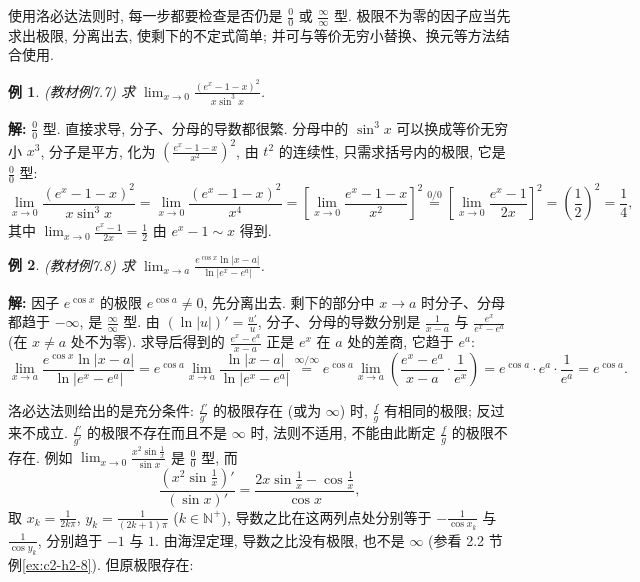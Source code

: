 \documentclass[UTF8,openany]{ctexbook}
\theoremstyle{chinesetextbook}
\newtheorem{example}{例}[section]
\newenvironment{cnsolution}{\par\indent\textbf{解:} \ignorespaces}{\par}
\begin{document}
使用洛必达法则时, 每一步都要检查是否仍是 $\displaystyle\frac00$ 或 $\displaystyle\frac\infty\infty$ 型. 极限不为零的因子应当先求出极限, 分离出去, 使剩下的不定式简单; 并可与等价无穷小替换、换元等方法结合使用.
\begin{example}\label{ex:c2-7-7}
\textnormal{(教材例7.7)} 求 $\displaystyle\lim_{x\to0}\frac{(e^x-1-x)^2}{x\sin^3x}$.
\end{example}
\begin{cnsolution}
$\displaystyle\frac00$ 型. 直接求导, 分子、分母的导数都很繁. 分母中的 $\sin^3x$ 可以换成等价无穷小 $x^3$, 分子是平方, 化为 $\displaystyle\left(\frac{e^x-1-x}{x^2}\right)^2$, 由 $t^2$ 的连续性, 只需求括号内的极限, 它是 $\displaystyle\frac00$ 型:
\[
\lim_{x\to0}\frac{(e^x-1-x)^2}{x\sin^3x}=\lim_{x\to0}\frac{(e^x-1-x)^2}{x^4}=\left[\lim_{x\to0}\frac{e^x-1-x}{x^2}\right]^2\overset{0/0}{=}\left[\lim_{x\to0}\frac{e^x-1}{2x}\right]^2=\left(\frac12\right)^2=\frac14,
\]
其中 $\displaystyle\lim_{x\to0}\frac{e^x-1}{2x}=\frac12$ 由 $e^x-1\sim x$ 得到.
\end{cnsolution}
\begin{example}\label{ex:c2-7-8}
\textnormal{(教材例7.8)} 求 $\displaystyle\lim_{x\to a}\frac{e^{\cos x}\ln|x-a|}{\ln|e^x-e^a|}$.
\end{example}
\begin{cnsolution}
因子 $e^{\cos x}$ 的极限 $e^{\cos a}\ne0$, 先分离出去. 剩下的部分中 $x\to a$ 时分子、分母都趋于 $-\infty$, 是 $\displaystyle\frac\infty\infty$ 型. 由 $\displaystyle(\ln|u|)'=\frac{u'}u$, 分子、分母的导数分别是 $\displaystyle\frac1{x-a}$ 与 $\displaystyle\frac{e^x}{e^x-e^a}$ (在 $x\ne a$ 处不为零). 求导后得到的 $\displaystyle\frac{e^x-e^a}{x-a}$ 正是 $e^x$ 在 $a$ 处的差商, 它趋于 $e^a$:
\[
\lim_{x\to a}\frac{e^{\cos x}\ln|x-a|}{\ln|e^x-e^a|}=e^{\cos a}\lim_{x\to a}\frac{\ln|x-a|}{\ln|e^x-e^a|}\overset{\infty/\infty}{=}e^{\cos a}\lim_{x\to a}\left(\frac{e^x-e^a}{x-a}\cdot\frac1{e^x}\right)=e^{\cos a}\cdot e^a\cdot\frac1{e^a}=e^{\cos a}.
\]
\end{cnsolution}
洛必达法则给出的是充分条件: $\displaystyle\frac{f'}{g'}$ 的极限存在 (或为 $\infty$) 时, $\displaystyle\frac fg$ 有相同的极限; 反过来不成立. $\displaystyle\frac{f'}{g'}$ 的极限不存在而且不是 $\infty$ 时, 法则不适用, 不能由此断定 $\displaystyle\frac fg$ 的极限不存在. 例如 $\displaystyle\lim_{x\to0}\frac{x^2\sin\frac1x}{\sin x}$ 是 $\displaystyle\frac00$ 型, 而
\[
\frac{\left(x^2\sin\frac1x\right)'}{(\sin x)'}=\frac{2x\sin\frac1x-\cos\frac1x}{\cos x},
\]
取 $\displaystyle x_k=\frac1{2k\pi}$, $\displaystyle y_k=\frac1{(2k+1)\pi}$ ($k\in\mathbb N^+$), 导数之比在这两列点处分别等于 $\displaystyle-\frac1{\cos x_k}$ 与 $\displaystyle\frac1{\cos y_k}$, 分别趋于 $-1$ 与 $1$. 由海涅定理, 导数之比没有极限, 也不是 $\infty$ (参看 2.2 节例\ref{ex:c2-h2-8}). 但原极限存在:
\end{document}
